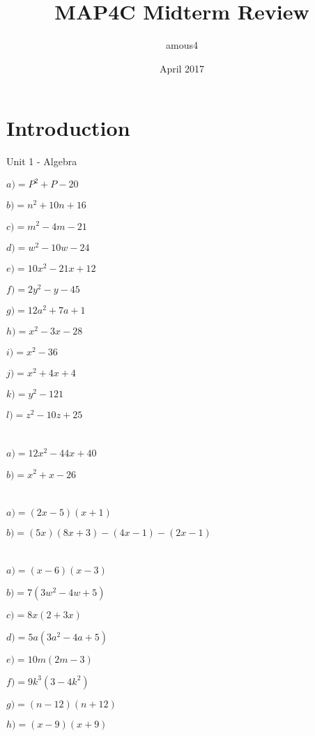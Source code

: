 \documentclass{article}
\title{MAP4C Midterm Review}
\author{amous4 }
\date{April 2017}
\begin{document}
\maketitle

\section{Introduction}
Unit 1 - Algebra

$a) = P^2 + P - 20$

$b) = n^2 + 10n + 16$

$c) = m^2 - 4m - 21$

$d) = w^2 - 10w - 24$

$e) = 10x^2 - 21x + 12$

$f) = 2y^2 - y - 45$

$g) = 12a^2 + 7a +1$

$h) = x^2 - 3x - 28$

$i) = x^2 - 36 $

$j) = x^2 + 4x + 4$

$k) = y^2 - 121$

$l) = z^2 - 10z + 25$


\section{}

$a) = 12x^2 - 44x + 40$

$b) = x^2 + x - 26$

\section{}

$a) = (2x - 5) (x + 1)$

$b) = (5x) (8x + 3) - (4x-1) - (2x - 1)$

\section{}

$a) = (x - 6) (x - 3)$

$b) = 7(3w^2 - 4w + 5)$

$c) = 8x(2 + 3x)$

$d) = 5a(3a^2 - 4a + 5)$

$e) = 10m (2m - 3)$

$f) = 9k^3 (3 - 4k^2)$

$g) = (n - 12) (n + 12)$

$h) = (x - 9) (x + 9)$
\end{document}
